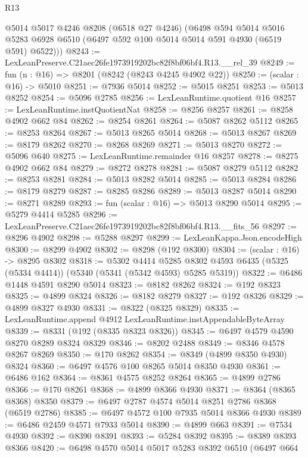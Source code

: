 \begin{lexlean}{R13}
\begin{coremodule}
      @5014
      @5017
      @4246
      @8208
      (@6518 @27 @4246)
      (@6498
        @594
        @5014
        @5016
        @5283
        @6928
        @6510
        (@6497 @592 @100 @5014 @5014 @591 @4930 (@6519 @591) @6522)))
@8243 := LexLeanPreserve.C21aec26fe1973919202bc82f8bf06bf4.R13.__rel_39
@8249 := fun (n : @16) => @8201 (@8242 (@8243 @4245 @4902 @22))
@8250 := (scalar : @16) -> @5010
@8251 := @7936 @5014
@8252 := @5015 @8251
@8253 := @5013 @8252
@8254 := @5096 @2785
@8256 := LexLeanRuntime.quotient @16
@8257 := LexLeanRuntime.instQuotientNat
@8258 := @8256 @8257
@8261 := @8258 @4902 @662 @84
@8262 := @8254 @8261
@8264 := @5087 @8262 @5112
@8265 := @8253 @8264
@8267 := @5013 @8265 @5014
@8268 := @5013 @8267
@8269 := @8179 @8262
@8270 := @8268 @8269
@8271 := @5013 @8270
@8272 := @5096 @640
@8275 := LexLeanRuntime.remainder @16 @8257
@8278 := @8275 @4902 @662 @84
@8279 := @8272 @8278
@8281 := @5087 @8279 @5112
@8282 := @8253 @8281
@8284 := @5013 @8282 @5014
@8285 := @5013 @8284
@8286 := @8179 @8279
@8287 := @8285 @8286
@8289 := @5013 @8287 @5014
@8290 := @8271 @8289
@8293 := fun (scalar : @16) => @5013 @8290 @5014
@8295 := @5279 @4414 @5285
@8296 := LexLeanPreserve.C21aec26fe1973919202bc82f8bf06bf4.R13.__fits_56
@8297 := @8296 @4902
@8298 := @5288 @8297
@8299 := LexLeanKappa.Json.encodeHigh
@8300 := @8299 @4902
@8302 := @8298 (@192 @8300)
@8304 := (scalar : @16) -> @8295 @8302
@8318 := @5302
    @4414
    @5285
    @8302
    @4593
    @6435
    (@5325 (@5334 @4414))
    (@5340 (@5341 (@5342 @4593) @5285 @5319))
@8322 := @6486 @1448 @4591 @8290 @5014
@8323 := @8182 @8262
@8324 := @192 @8323
@8325 := @4899 @8324
@8326 := @8182 @8279
@8327 := @192 @8326
@8329 := @4899 @8327 @4930
@8331 := @8322 (@8325 @8329)
@8335 := LexLeanRuntime.append @4912 LexLeanRuntime.instAppendableByteArray
@8339 := @8331 (@192 (@8335 @8323 @8326))
@8345 := @6497 @4579 @4590 @8270 @8289 @8324 @8329
@8346 := @8202 @2488
@8349 := @8346 @4578 @8267 @8269
@8350 := @170 @8262
@8354 := @8349 (@4899 @8350 @4930) @8324
@8360 := @6497 @4576 @100 @8265 @5014 @8350 @4930
@8361 := @6486 @162
@8364 := @8361 @4575 @8252 @8264
@8365 := @4899 @2786
@8366 := @170 @8261
@8368 := @4899 @8366 @4930
@8371 := @8364 (@8365 @8368) @8350
@8379 := @6497 @2787 @4574 @5014 @8251 @2786 @8368 (@6519 @2786)
@8385 := @6497 @4572 @100 @7935 @5014 @8366 @4930
@8389 := @6486 @2459 @4571 @7933 @5014
@8390 := @4899 @663
@8391 := @7534 @4930
@8392 := @8390 @8391
@8393 := @5284 @8392
@8395 := @8389 @8393 @8366
@8420 := @6498
    @4570
    @5014
    @5017
    @5283
    @8392
    @6510
    (@6497
      @664

\end{coremodule}
\end{lexlean}
